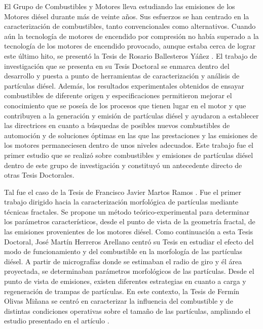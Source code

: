 \par El Grupo de Combustibles y Motores lleva estudiando las emisiones de los Motores diésel durante más de veinte años. Sus esfuerzos se han centrado en la caracterización de combustibles, tanto convencionales como alternativos. Cuando aún la tecnología de motores de encendido por compresión no había superado a la tecnología de los motores de encendido provocado, aunque estaba cerca de lograr este último hito, se presentó la Tesis de Rosario Ballesteros Yáñez \cite{chariphD:2002}. El trabajo de investigación que se presenta en su Tesis Doctoral se enmarca dentro del desarrollo y puesta a punto de herramientas de caracterización y análisis de partículas diésel. Además, los resultados experimentales obtenidos de ensayar combustibles de diferente origen y especificaciones permitieron mejorar el conocimiento que se poseía de los procesos que tienen lugar en el motor y que contribuyen a la generación y emisión de partículas diésel y ayudaron a establecer las directrices en cuanto a búsquedas de posibles nuevos combustibles de automoción y de soluciones óptimas en las que las prestaciones y las emisiones de los motores permaneciesen dentro de unos niveles adecuados. Este trabajo fue el primer estudio que se realizó sobre combustibles y emisiones de partículas diésel dentro de este grupo de investigación y constituyó un antecedente directo de otras Tesis Doctorales. 

\par Tal fue el caso de la Tesis de Francisco Javier Martos Ramos \cite{martosphD:2006}. Fue el primer trabajo dirigido hacia la caracterización morfológica de partículas mediante técnicas fractales. Se propone un método teórico-experimental para determinar los parámetros característicos, desde el punto de vista de la geometría fractal, de las emisiones provenientes de los motores diésel. Como continuación a esta Tesis Doctoral, José Martín Herreros Arellano \cite{martinphD:2009} centró su Tesis en estudiar el efecto del modo de funcionamiento y del combustible en la morfología de las partículas diésel. A partir de micrografías donde se estimaban el radio de giro y él área proyectada, se determinaban parámetros morfológicos de las partículas. Desde el punto de vista de emisiones, existen diferentes estrategias en cuanto a carga y regeneración de trampas de partículas. En este contexto, la Tesis de Fermín Olivas Miñana \cite{ferminphD:2012} se centró en caracterizar la influencia del combustible y de distintas condiciones operativas sobre el tamaño de las partículas, ampliando el estudio presentado en el artículo \cite{lapuertaetal:2007}.


